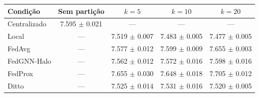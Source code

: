 
\begin{tabular}{lcccc}
\toprule
Condição & Sem partição & $k=5$ & $k=10$ & $k=20$ \\
\midrule
Centralizado & \num{7.595} $\pm$ \num{0.021} & --- & --- & --- \\
\midrule
Local & --- & \num{7.519} $\pm$ \num{0.007} & \num{7.483} $\pm$ \num{0.005} & \num{7.477} $\pm$ \num{0.005} \\
FedAvg & --- & \num{7.577} $\pm$ \num{0.012} & \num{7.599} $\pm$ \num{0.009} & \num{7.655} $\pm$ \num{0.003} \\
FedGNN-Halo & --- & \num{7.562} $\pm$ \num{0.012} & \num{7.572} $\pm$ \num{0.016} & \num{7.598} $\pm$ \num{0.016} \\
FedProx & --- & \num{7.655} $\pm$ \num{0.030} & \num{7.648} $\pm$ \num{0.018} & \num{7.705} $\pm$ \num{0.012} \\
Ditto & --- & \num{7.525} $\pm$ \num{0.014} & \num{7.531} $\pm$ \num{0.016} & \num{7.520} $\pm$ \num{0.005} \\
\bottomrule
\end{tabular}
